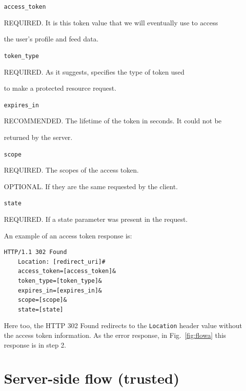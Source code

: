 \texttt{access\_token}

\hspace{0.5cm}REQUIRED. It is this token value that we will eventually use to access

\hspace{0.5cm}the user's profile and feed data.

\texttt{token\_type}

\hspace{0.5cm}REQUIRED. As it suggests, specifies the type of token used

\hspace{0.5cm}to make a protected resource request.

\texttt{expires\_in}

\hspace{0.5cm}RECOMMENDED. The lifetime of the token in seconds. It could not be

\hspace{0.5cm}returned by the server.

\texttt{scope}

\hspace{0.5cm}REQUIRED. The scopes of the access token.

\hspace{0.5cm}OPTIONAL. If they are the same requested by the client.

\texttt{state}

\hspace{0.5cm}REQUIRED. If a state parameter was present in the request.

\noindent An example of an access token response is:

\begin{lstlisting}[basicstyle=\ttfamily]
  HTTP/1.1 302 Found
    Location: [redirect_uri]#
    access_token=[access_token]&
    token_type=[token_type]&
    expires_in=[expires_in]&
    scope=[scope]&
    state=[state]
\end{lstlisting}

\noindent Here too, the HTTP 302 Found redirects to the \texttt{Location} header value without the access token information. As the error response, in Fig.~\ref{fig:flowa} this response is in step 2.


\section{Server-side flow (trusted)}
\label{authcg}

